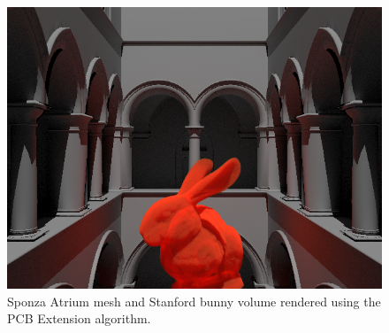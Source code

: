 \documentclass[12pt]{ucthesis}
\begin{document}
\begin{figure}[h!]
    \centering
    \includegraphics[width=120mm]{img/sponza.png}
    \caption{Sponza Atrium mesh and Stanford bunny volume rendered using the PCB Extension algorithm.}
    \label{fig:sponza_results}
\end{figure}
\end{document}
